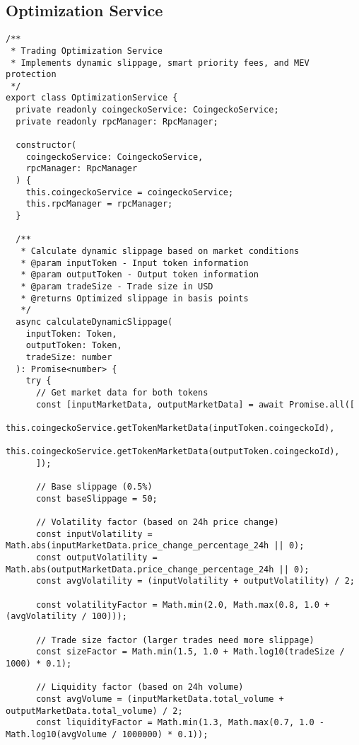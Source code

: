 \documentclass[11pt,a4paper]{article}
\begin{document}
\subsection{Optimization Service}

\begin{lstlisting}[style=typescript, caption=Advanced Trading Optimizations]
/**
 * Trading Optimization Service
 * Implements dynamic slippage, smart priority fees, and MEV protection
 */
export class OptimizationService {
  private readonly coingeckoService: CoingeckoService;
  private readonly rpcManager: RpcManager;

  constructor(
    coingeckoService: CoingeckoService,
    rpcManager: RpcManager
  ) {
    this.coingeckoService = coingeckoService;
    this.rpcManager = rpcManager;
  }

  /**
   * Calculate dynamic slippage based on market conditions
   * @param inputToken - Input token information
   * @param outputToken - Output token information  
   * @param tradeSize - Trade size in USD
   * @returns Optimized slippage in basis points
   */
  async calculateDynamicSlippage(
    inputToken: Token,
    outputToken: Token,
    tradeSize: number
  ): Promise<number> {
    try {
      // Get market data for both tokens
      const [inputMarketData, outputMarketData] = await Promise.all([
        this.coingeckoService.getTokenMarketData(inputToken.coingeckoId),
        this.coingeckoService.getTokenMarketData(outputToken.coingeckoId),
      ]);

      // Base slippage (0.5%)
      const baseSlippage = 50;

      // Volatility factor (based on 24h price change)
      const inputVolatility = Math.abs(inputMarketData.price_change_percentage_24h || 0);
      const outputVolatility = Math.abs(outputMarketData.price_change_percentage_24h || 0);
      const avgVolatility = (inputVolatility + outputVolatility) / 2;
      
      const volatilityFactor = Math.min(2.0, Math.max(0.8, 1.0 + (avgVolatility / 100)));

      // Trade size factor (larger trades need more slippage)
      const sizeFactor = Math.min(1.5, 1.0 + Math.log10(tradeSize / 1000) * 0.1);

      // Liquidity factor (based on 24h volume)
      const avgVolume = (inputMarketData.total_volume + outputMarketData.total_volume) / 2;
      const liquidityFactor = Math.min(1.3, Math.max(0.7, 1.0 - Math.log10(avgVolume / 1000000) * 0.1));


\end{lstlisting}
\end{document}
